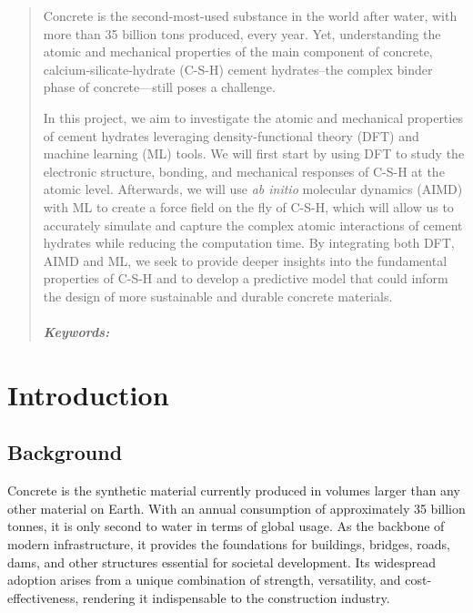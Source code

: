 \documentclass[12pt, titlepage, twoside, openright, usernames, dvipsnames]{thesis}
\theoremstyle{definition}
\theoremstyle{definition}
\begin{document}
\begin{abstract} 
Concrete is the second-most-used substance in the world after water, with more than 35 billion tons produced, every year. Yet, understanding the atomic and mechanical properties of the main component of concrete, calcium-silicate-hydrate (C-S-H) cement hydrates--the complex binder phase of concrete---still poses a challenge.
  
In this project, we aim to investigate the atomic and mechanical properties of cement hydrates leveraging density-functional theory (DFT) and machine learning (ML) tools. We will first start by using DFT to study the electronic structure, bonding, and mechanical responses of C-S-H  at the atomic level. Afterwards, we will use \emph{ab initio} molecular dynamics (AIMD) with ML to create a force field on the fly of C-S-H, which will allow us to accurately simulate and capture the complex atomic interactions of cement hydrates while reducing the computation time. By integrating both DFT, AIMD and ML, we seek to provide deeper insights into the fundamental properties of C-S-H and to develop a predictive model that could inform the design of more sustainable and durable concrete materials.
 \\
  \\
 \emph{\textbf{Keywords:}}
\end{abstract}

\tableofcontents
{}
\listoffigures
{}
\listoftables
{}


\mainbody
\chapter{Introduction}\label{Introduction}\glsresetall 

  \section{Background}\label{Background} 
  Concrete is the synthetic material currently produced in volumes larger than any other material on Earth. With an annual consumption of approximately 35 billion tonnes, it is only second to water in terms of global usage\cite{Monteiro2017, VanDamme2018}. As the backbone of modern infrastructure, it provides the foundations for buildings, bridges, roads, dams, and other structures essential for societal development. Its widespread adoption arises from a unique combination of strength, versatility, and cost-effectiveness\cite{Mehta2014}, rendering it indispensable to the construction industry.
\end{document}
